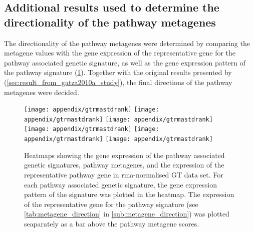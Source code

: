 \begin{appendices}
	\newpage


	\section{Additional results used to determine the directionality of the pathway metagenes}
	\label{sec:additional_results_to_determine_the_directionality_of_the_pathway_metagenes}

	The directionality of the pathway metagenes were determined by comparing the metagene values with the gene expression of the representative gene for the pathway associated genetic signature, as well as the gene expression pattern of the pathway signature (\cref{fig:appendix/gt_pathmeta_rank}).
	Together with the original results presented by \citet{Gatza2010a} (\cref{sec:result_from_gatza2010a_study}), the final directions of the pathway metagenes were decided.

	\begin{figure}[htp!]
		\centering
		\texttt{[image: appendix/gtrmastdrank]}
		\texttt{[image: appendix/gtrmastdrank]}
		\texttt{[image: appendix/gtrmastdrank]}\\
		\texttt{[image: appendix/gtrmastdrank]}
		\texttt{[image: appendix/gtrmastdrank]}
		\texttt{[image: appendix/gtrmastdrank]}\\
		\caption[Directionality of the pathway metagenes in the GT data]{Heatmaps showing the gene expression of the pathway associated genetic signatures, pathway metagenes, and the expression of the representative pathway gene in \gls{rma}-normalised GT data set.
		For each pathway associated genetic signature, the gene expression pattern of the signature was plotted in the heatmap.
		The expression of the representative gene for the pathway signature (see \cref{tab:metagene_direction} in \cref{sub:metagene_direction}) was plotted seaparately as a bar above the pathway metagene scores.
		}
		\label{fig:appendix/gt_pathmeta_rank}
	\end{figure}


\end{appendices}
